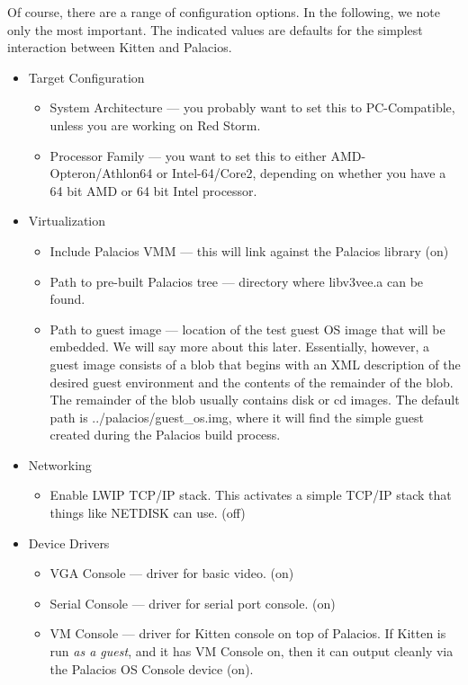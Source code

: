 \documentclass[11pt]{article}
\begin{document}
Of course, there are a range of configuration options.  In the
following, we note only the most important.  The indicated values are
defaults for the simplest interaction between Kitten and Palacios.
\begin{itemize}
\item Target Configuration
\begin{itemize}
\item System Architecture --- you probably want to set this to
PC-Compatible, unless you are working on Red Storm.
\item Processor Family --- you want to set this to either
AMD-Opteron/Athlon64 or Intel-64/Core2, depending on whether you have
a 64 bit AMD or 64 bit Intel processor.
\end{itemize}
\item Virtualization
\begin{itemize}
\item Include Palacios VMM --- this will link against the Palacios
library (on)
\item Path to pre-built Palacios tree --- directory where libv3vee.a
can be found.
\item Path to guest image --- location of the test guest OS
image that will be embedded.  We will say more about this later.
Essentially, however, a guest image consists of a blob that begins
with an XML description of the desired guest environment and the
contents of the remainder of the blob.  The remainder of the blob
usually contains disk or cd images.  The default path is
../palacios/guest\_os.img, where it will find the simple guest created
during the Palacios build process.
\end{itemize}
\item Networking 
\begin{itemize}
\item Enable LWIP TCP/IP stack.  This activates a simple TCP/IP stack
that things like NETDISK can use. (off)
\end{itemize}
\item Device Drivers
\begin{itemize}
\item VGA Console --- driver for basic video. (on)
\item Serial Console --- driver for serial port console.  (on)
\item VM Console --- driver for Kitten console on top of Palacios.  If
Kitten is run {\em as a guest}, and it has VM Console on, then it can output
cleanly via the Palacios OS Console device (on).

\end{itemize}
\end{itemize}
\end{document}
